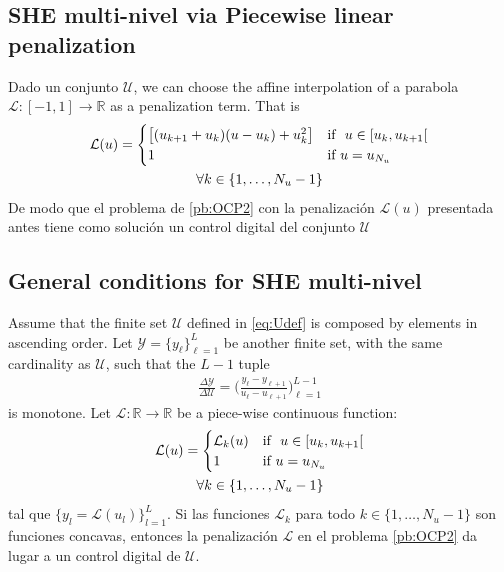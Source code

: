 \subsection{SHE multi-nivel via Piecewise linear penalization}

\begin{theorem}
    Dado un conjunto $\mathcal{U}$, we can choose the affine interpolation of a parabola $\mathcal{L}:[-1,1] \rightarrow \mathbb{R}$ as a penalization term. That is
    \begin{gather}\label{PLP}
        \mathcal{L}(u) = \begin{cases}
            \big[ (u_{k+1}+u_{k}) (u-u_k) + u_k^2 \big] & \text{if }  u \in [u_k,u_{k+1}[ \\
            1 & \text{if } u = u_{N_u} 
        \end{cases} \\
        \notag \forall k \in \{1,\dots,N_u-1\}
    \end{gather}
    De modo que el problema de \ref{pb:OCP2} con la penalización $\mathcal{L}(u)$ presentada antes tiene como solución un control digital del conjunto $\mathcal{U}$
\end{theorem}
\subsection{General conditions for  SHE multi-nivel}   

\begin{theorem}
    Assume that the finite set $\mathcal{U}$ defined in \eqref{eq:Udef} is composed by elements in ascending order. Let $\mathcal{Y} = \{y_\ell\}_{\ell=1}^L$ be another finite set, with the same cardinality as $\mathcal U$, such that the $L-1$ tuple
    \begin{gather}
        \frac{\Delta \mathcal{Y}}{\Delta \mathcal{U}} = \Bigg( \frac{y_\ell - y_{\ell+1}}{u_\ell - u_{\ell+1}} \Bigg)_{\ell=1}^{L-1}
    \end{gather}  is monotone. Let $\mathcal{L}:\mathbb{R} \rightarrow \mathbb{R}$ be a piece-wise continuous function:
    \begin{gather}
        \mathcal{L}(u) = \begin{cases}
            \mathcal{L}_k(u) & \text{if }  u \in [u_k,u_{k+1}[ \\
            1 & \text{if } u = u_{N_u} 
        \end{cases} \\
        \notag \forall k \in \{1,\dots,N_u-1\}
    \end{gather}    
    tal que $\{y_l = \mathcal{L}(u_l)\}_{l=1}^L$. Si las funciones $\mathcal{L}_k$ para todo $k \in  \{1,\dots,N_u-1\}$  son funciones concavas, entonces la penalización $\mathcal{L}$ en el problema \ref{pb:OCP2} da lugar a un control digital de $\mathcal{U}$.
\end{theorem}